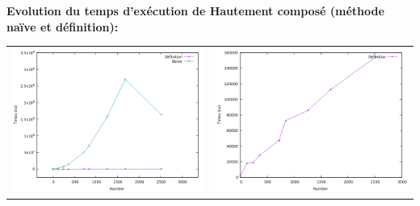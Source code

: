 		\begin{frame}
		\textbf{Evolution du temps d'exécution de Hautement composé (méthode naïve et définition): }
		
		\footnotesize\begin{longtable}{l l}		
	\hspace{-2em}\includegraphics[scale=0.27]{HC.png}  & \includegraphics[scale=0.27]{HCdef.png}\\
	\end{longtable}
		\end{frame}
		
